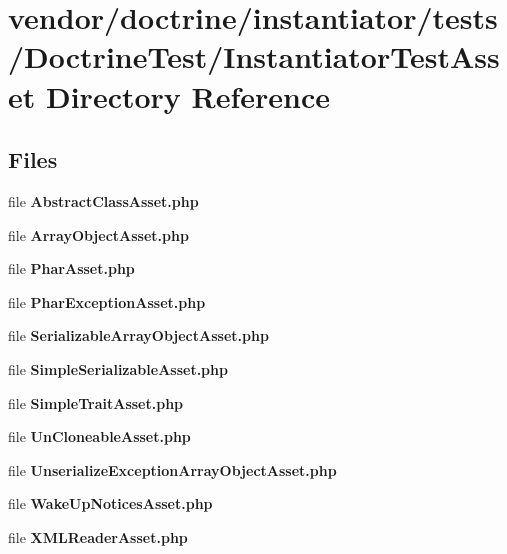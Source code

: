 \section{vendor/doctrine/instantiator/tests/\+Doctrine\+Test/\+Instantiator\+Test\+Asset Directory Reference}
\label{dir_1c0d06b9a17a548710ed06f57861b372}
\subsection*{Files}
\begin{DoxyCompactItemize}
\item 
file {\bf Abstract\+Class\+Asset.\+php}
\item 
file {\bf Array\+Object\+Asset.\+php}
\item 
file {\bf Phar\+Asset.\+php}
\item 
file {\bf Phar\+Exception\+Asset.\+php}
\item 
file {\bf Serializable\+Array\+Object\+Asset.\+php}
\item 
file {\bf Simple\+Serializable\+Asset.\+php}
\item 
file {\bf Simple\+Trait\+Asset.\+php}
\item 
file {\bf Un\+Cloneable\+Asset.\+php}
\item 
file {\bf Unserialize\+Exception\+Array\+Object\+Asset.\+php}
\item 
file {\bf Wake\+Up\+Notices\+Asset.\+php}
\item 
file {\bf X\+M\+L\+Reader\+Asset.\+php}
\end{DoxyCompactItemize}
